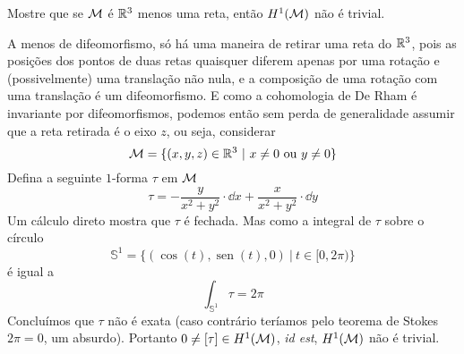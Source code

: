 




\begin{Mybox}
Mostre que se $\mathcal{M}$ é $\mathbb{R}^3$ menos uma reta, então $H^1(\mathcal{M})$ não é trivial.
\vspace{-.4cm}
\end{Mybox}
\vspace{-.5cm}
\begin{dem}
A menos de difeomorfismo, só há uma maneira de retirar uma reta do $\mathbb{R}^3$, pois as posições dos pontos de duas retas quaisquer diferem apenas por uma rotação e (possivelmente) uma translação não nula, e a composição de uma rotação com uma translação é um difeomorfismo. E como a cohomologia de De Rham é invariante por difeomorfismos, podemos então sem perda de generalidade assumir que a reta retirada é o eixo $z$, ou seja, considerar \[
\mathcal{M} = \{(x, y, z) \in \mathbb{R}^3 \ \vert \ x \neq 0 \text{ ou } y \neq 0 \}
\] Defina a seguinte $1$-forma $\tau$ em $\mathcal{M}$ 
\[
\tau = -\frac{y}{x^2 + y^2 } \cdot \dd x + \frac{x}{x^2 + y^2} \cdot \dd y
\]
Um cálculo direto mostra que $\tau$ é fechada. Mas como a integral de $\tau$ sobre o círculo
\[
\mathbb{S}^1 = \{(\cos(t), \operatorname{sen}(t), 0) \ \vert \ t \in [0, 2 \pi) \}
\]
é igual a
\[
\int_{\mathbb{S}^1} \tau = 2 \pi
\]
Concluímos que $\tau$ não é exata (caso contrário teríamos pelo teorema de Stokes $2 \pi = 0$, um absurdo). Portanto $0 \neq [\tau] \in H^1(\mathcal{M})$, \emph{id est}, $H^1(\mathcal{M})$ não é trivial.
\end{dem}


